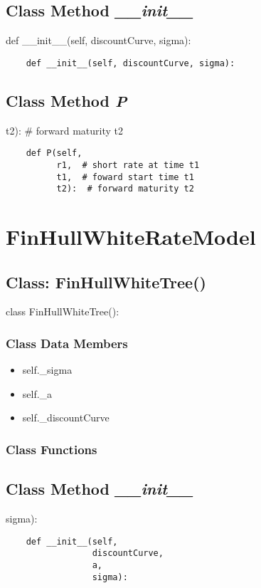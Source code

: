 \documentclass[twoside,11pt]{book}
\begin{document}
\subsection{Class Method {\it \_\_init\_\_}}
def \_\_init\_\_(self, discountCurve, sigma):

\begin{lstlisting}
    def __init__(self, discountCurve, sigma):
\end{lstlisting}

\subsection{Class Method {\it P}}
t2):  \# forward maturity t2

\begin{lstlisting}
    def P(self,
          r1,  # short rate at time t1
          t1,  # foward start time t1
          t2):  # forward maturity t2
\end{lstlisting}

\newpage
\section{FinHullWhiteRateModel}

\subsection{Class: FinHullWhiteTree()}
class FinHullWhiteTree():

\subsubsection{Class Data Members}
\begin{itemize}
\item{self.\_sigma}
\item{self.\_a}
\item{self.\_discountCurve}
\end{itemize}

\subsubsection{Class Functions}

\subsection{Class Method {\it \_\_init\_\_}}
sigma):

\begin{lstlisting}
    def __init__(self,
                 discountCurve,
                 a,
                 sigma):
\end{lstlisting}
\end{document}

